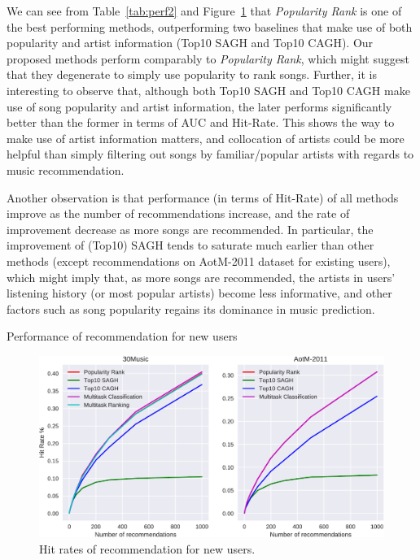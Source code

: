 We can see from Table~\ref{tab:perf2} and Figure~\ref{fig:hr2} that {\it Popularity Rank} is one of the best performing methods,
outperforming two baselines that make use of both popularity and artist information (\ie Top10 SAGH and Top10 CAGH).
Our proposed methods perform comparably to {\it Popularity Rank}, which might suggest that they degenerate to simply use popularity to rank songs.
Further, it is interesting to observe that, although both Top10 SAGH and Top10 CAGH make use of song popularity and artist information,
the later performs significantly better than the former in terms of AUC and Hit-Rate.
This shows the way to make use of artist information matters,
and collocation of artists could be more helpful than simply filtering out songs by familiar/popular artists
with regards to music recommendation.

Another observation is that performance (in terms of Hit-Rate) of all methods improve as the number of recommendations increase,
and the rate of improvement decrease as more songs are recommended.
In particular, the improvement of (Top10) SAGH tends to saturate much earlier than other methods
(except recommendations on AotM-2011 dataset for existing users),
which might imply that, as more songs are recommended, the artists in users' listening history
(or most popular artists) become less informative,
and other factors such as song popularity regains its dominance in music prediction.

\begin{table}[t]
\centering
\caption{Performance of recommendation for new users}
\label{tab:perf2}
\resizebox{\columnwidth}{!}{

}
\end{table}


\begin{figure}[t]
\centering
\includegraphics[width=\linewidth]{fig/hitrate2.pdf}
\caption{Hit rates of recommendation for new users.}
\label{fig:hr2}
\end{figure}

